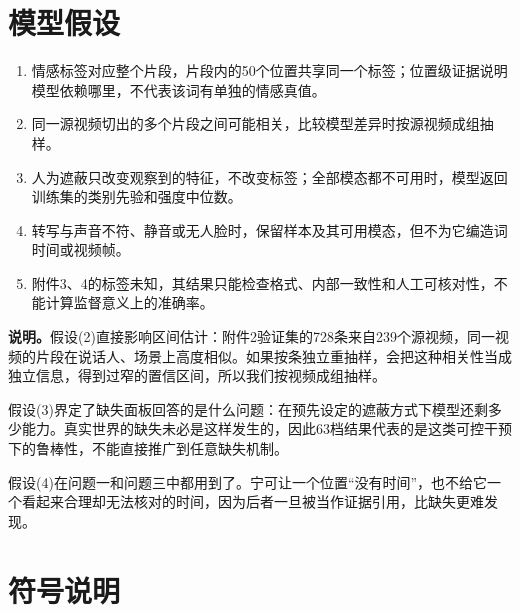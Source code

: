 \section{模型假设}

\begin{enumerate}[label=(\arabic*)]
\item 情感标签对应整个片段，片段内的50个位置共享同一个标签；位置级证据说明模型依赖哪里，不代表该词有单独的情感真值。
\item 同一源视频切出的多个片段之间可能相关，比较模型差异时按源视频成组抽样。
\item 人为遮蔽只改变观察到的特征，不改变标签；全部模态都不可用时，模型返回训练集的类别先验和强度中位数。
\item 转写与声音不符、静音或无人脸时，保留样本及其可用模态，但不为它编造词时间或视频帧。
\item 附件3、4的标签未知，其结果只能检查格式、内部一致性和人工可核对性，不能计算监督意义上的准确率。
\end{enumerate}

\textbf{说明。}假设(2)直接影响区间估计：附件2验证集的728条来自239个源视频，同一视频的片段在说话人、场景上高度相似。如果按条独立重抽样，会把这种相关性当成独立信息，得到过窄的置信区间，所以我们按视频成组抽样。

假设(3)界定了缺失面板回答的是什么问题：在预先设定的遮蔽方式下模型还剩多少能力。真实世界的缺失未必是这样发生的，因此63档结果代表的是这类可控干预下的鲁棒性，不能直接推广到任意缺失机制。

假设(4)在问题一和问题三中都用到了。宁可让一个位置“没有时间”，也不给它一个看起来合理却无法核对的时间，因为后者一旦被当作证据引用，比缺失更难发现。

\section{符号说明}

